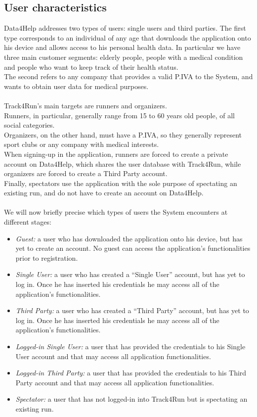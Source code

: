 \documentclass[titlepage]{article}
\begin{document}
	\subsection{User characteristics}
	Data4Help addresses two types of users: single users and third parties. 
The first type corresponds to an individual of any age that downloads the application onto his device and allows access to his personal health data. In particular we have three main customer segments: elderly people, people with a medical condition and people who want to keep track of their health status. \\
The second refers to any company that provides a valid P.IVA to the System, and wants to obtain user data for medical purposes.\\
\\
Track4Run’s main targets are runners and organizers.\\
Runners, in particular, generally range from 15 to 60 years old people, of all social categories. \\
Organizers, on the other hand, must have a P.IVA, so they generally represent sport clubs or any company with medical interests.\\
When signing-up in the application, runners are forced to create a private account on Data4Help, which shares the user database with Track4Run, while organizers are forced to create a Third Party account.\\
Finally, spectators use the application with the sole purpose of spectating an existing run, and do not have to create an account on Data4Help.\\
\\
We will now briefly precise which types of users the System encounters at different stages:
\begin{itemize}
	\item{\it Guest: } a user who has downloaded the application onto his device, but has yet to create an account. No guest can access the application’s functionalities prior to registration.
	\item {\it Single User: } a user who has created a “Single User” account, but has yet to log in. Once he has inserted his credentials he may access all of the application’s functionalities. 
	\item {\it Third Party: } a user who has created a “Third Party” account, but has yet to log in. Once he has inserted his credentials he may access all of the application’s functionalities.
	\item {\it Logged-in Single User: } a user that has provided the credentials to his Single User account and that may access all application functionalities.
	\item {\it Logged-in Third Party: } a user that has provided the credentials to his Third Party account and that may access all application functionalities.
	\item {\it Spectator: } a user that has not logged-in into Track4Run but is spectating an existing run. 
\end{itemize}	
\end{document}
